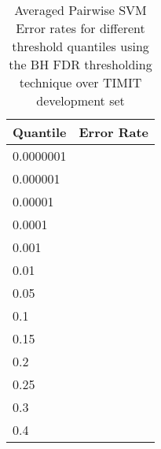 \documentclass{article}
\begin{document}
\begin{table}
  \centering
  \begin{tabular}{| l |  r |}
    \hline
     Quantile & Error Rate \\ \hline\hline
0.0000001 &  \\ \hline
0.000001 &  \\ \hline
0.00001 &  \\ \hline
0.0001 &  \\ \hline

0.001 &  \\ \hline
0.01 &  \\ \hline
0.05 &  \\ \hline
0.1 &  \\ \hline
0.15 &  \\ \hline
0.2 &  \\ \hline
0.25 &  \\ \hline
0.3 &  \\ \hline
0.4 &  \\ \hline
  \end{tabular}
  \caption{Averaged Pairwise SVM Error rates for different threshold quantiles using the BH FDR thresholding technique over TIMIT development set}
  \label{tab:pairwise_bhfdr_thresholding_results}
\end{table}
\end{document}
